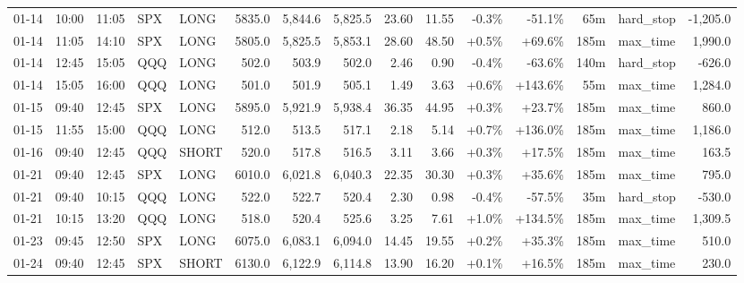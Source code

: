 \documentclass[11pt,a4paper,twoside]{article}
\begin{document}
\begin{landscape}
\begin{center}
\begin{longtable}{>{\color{txtmain}}l l l l l r r r r r r r r >{\color{txtmain}}l r}
01-14 & 10:00 & 11:05 & SPX & LONG & 5835.0 & 5,844.6 & 5,825.5 & 23.60 & 11.55 & \textcolor{lossred}{-0.3\%} & \textcolor{lossred}{-51.1\%} & 65m & hard\_stop & \textcolor{lossred}{-1,205.0} \\
01-14 & 11:05 & 14:10 & SPX & LONG & 5805.0 & 5,825.5 & 5,853.1 & 28.60 & 48.50 & \textcolor{wingreen}{+0.5\%} & \textcolor{wingreen}{+69.6\%} & 185m & max\_time & \textcolor{wingreen}{1,990.0} \\
01-14 & 12:45 & 15:05 & QQQ & LONG & 502.0 & 503.9 & 502.0 & 2.46 & 0.90 & \textcolor{lossred}{-0.4\%} & \textcolor{lossred}{-63.6\%} & 140m & hard\_stop & \textcolor{lossred}{-626.0} \\
01-14 & 15:05 & 16:00 & QQQ & LONG & 501.0 & 501.9 & 505.1 & 1.49 & 3.63 & \textcolor{wingreen}{+0.6\%} & \textcolor{wingreen}{+143.6\%} & 55m & max\_time & \textcolor{wingreen}{1,284.0} \\
01-15 & 09:40 & 12:45 & SPX & LONG & 5895.0 & 5,921.9 & 5,938.4 & 36.35 & 44.95 & \textcolor{wingreen}{+0.3\%} & \textcolor{wingreen}{+23.7\%} & 185m & max\_time & \textcolor{wingreen}{860.0} \\
01-15 & 11:55 & 15:00 & QQQ & LONG & 512.0 & 513.5 & 517.1 & 2.18 & 5.14 & \textcolor{wingreen}{+0.7\%} & \textcolor{wingreen}{+136.0\%} & 185m & max\_time & \textcolor{wingreen}{1,186.0} \\
01-16 & 09:40 & 12:45 & QQQ & SHORT & 520.0 & 517.8 & 516.5 & 3.11 & 3.66 & \textcolor{wingreen}{+0.3\%} & \textcolor{wingreen}{+17.5\%} & 185m & max\_time & \textcolor{wingreen}{163.5} \\
01-21 & 09:40 & 12:45 & SPX & LONG & 6010.0 & 6,021.8 & 6,040.3 & 22.35 & 30.30 & \textcolor{wingreen}{+0.3\%} & \textcolor{wingreen}{+35.6\%} & 185m & max\_time & \textcolor{wingreen}{795.0} \\
01-21 & 09:40 & 10:15 & QQQ & LONG & 522.0 & 522.7 & 520.4 & 2.30 & 0.98 & \textcolor{lossred}{-0.4\%} & \textcolor{lossred}{-57.5\%} & 35m & hard\_stop & \textcolor{lossred}{-530.0} \\
01-21 & 10:15 & 13:20 & QQQ & LONG & 518.0 & 520.4 & 525.6 & 3.25 & 7.61 & \textcolor{wingreen}{+1.0\%} & \textcolor{wingreen}{+134.5\%} & 185m & max\_time & \textcolor{wingreen}{1,309.5} \\
01-23 & 09:45 & 12:50 & SPX & LONG & 6075.0 & 6,083.1 & 6,094.0 & 14.45 & 19.55 & \textcolor{wingreen}{+0.2\%} & \textcolor{wingreen}{+35.3\%} & 185m & max\_time & \textcolor{wingreen}{510.0} \\
01-24 & 09:40 & 12:45 & SPX & SHORT & 6130.0 & 6,122.9 & 6,114.8 & 13.90 & 16.20 & \textcolor{wingreen}{+0.1\%} & \textcolor{wingreen}{+16.5\%} & 185m & max\_time & \textcolor{wingreen}{230.0} \\

\end{longtable}
\end{center}
\end{landscape}
\end{document}
